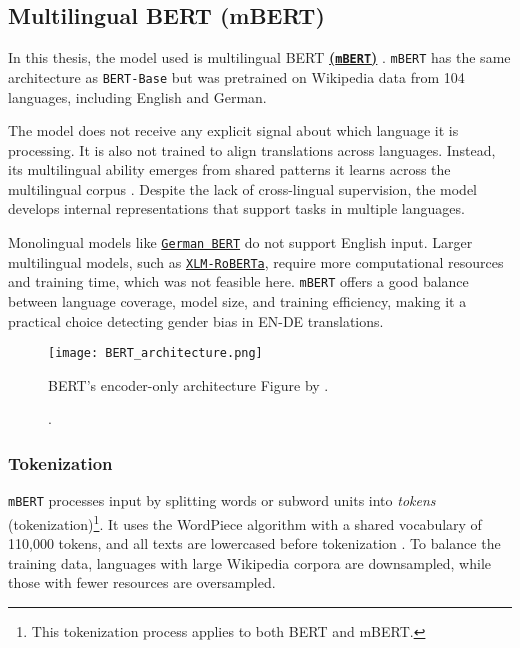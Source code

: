 \subsection{Multilingual BERT (mBERT)}
    In this thesis, the model used is multilingual BERT \textbf{\href{https://huggingface.co/google-bert/bert-base-multilingual-cased}{(\texttt{mBERT})}} \parencite{devlinBERTPretrainingDeep2019}. \texttt{mBERT} has the same architecture as \texttt{BERT-Base} but was pretrained on Wikipedia data from 104 languages, including English and German.
    
    The model does not receive any explicit signal about which language it is processing. It is also not trained to align translations across languages. Instead, its multilingual ability emerges from shared patterns it learns across the multilingual corpus \parencite{piresHowMultilingualMultilingual2019}. Despite the lack of cross-lingual supervision, the model develops internal representations that support tasks in multiple languages.

    Monolingual models like \href{https://huggingface.co/google-bert/bert-base-german-cased}{\texttt{German BERT}} do not support English input. Larger multilingual models, such as \href{https://huggingface.co/docs/transformers/en/model_doc/xlm-roberta}{\texttt{XLM-RoBERTa}}, require more computational resources and training time, which was not feasible here. \texttt{mBERT} offers a good balance between language coverage, model size, and training efficiency, making it a practical choice detecting gender bias in EN-DE translations.

\begin{figure}
    \centering
	\texttt{[image: BERT\_architecture.png]}	
    \caption[BERT's encoder-only architecture].{BERT's encoder-only architecture Figure by \textcite{smithCompleteGuideBERT2024}.}
    \label{fig:bert_arch}
\end{figure}

\subsubsection{Tokenization}
\texttt{mBERT} processes input by splitting words or subword units into \textit{tokens} (tokenization)\footnote{This tokenization process applies to both BERT and mBERT.}. It uses the WordPiece algorithm with a shared vocabulary of 110,000 tokens, and all texts are lowercased before tokenization \parencite{devlinMultilingualBERTGitHub2018}. To balance the training data, languages with large Wikipedia corpora are downsampled, while those with fewer resources are oversampled.

